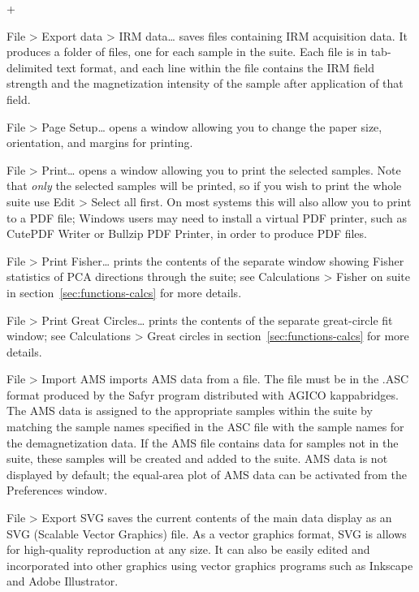\documentclass[a4paper,british]{article}
\newcommand{\menuitemlabel}[1]{%
\mbox{\textsf{#1}}\hfil}
\newenvironment{menuitemlist}%
{\begin{list}{}{%
\renewcommand{\makelabel}{\menuitemlabel}%
\setlength{\labelwidth}{35pt}%
\setlength{\leftmargin}%
             {\labelwidth+\labelsep}}}%
{\end{list}}
\newcommand{\ppcmd}[1]{\textsf{#1}} %
\newcommand{\caps}[1]{\MakeTextUppercase{#1}} %
\newcommand{\submenu}{ \textgreater{} } %
\begin{document}
\begin{menuitemlist}
\item[File\submenu Export data\submenu IRM data\ldots] saves files containing
\caps{irm} acquisition data. It produces a folder of files, one for each
sample in the suite. Each file is in tab-delimited text format, and each line
within the file contains the \caps{irm} field strength and the magnetization
intensity of the sample after application of that field.

\item[File\submenu Page Setup\ldots] opens a window allowing you
to change the paper size, orientation, and margins for printing.

\item[File\submenu Print\ldots] opens a window allowing you to print the
selected samples. Note that {\em only} the selected samples will be printed,
so if you wish to print the whole suite use \ppcmd{Edit\submenu Select all} first.
On most systems this will also allow you to print to a \caps{pdf} file;
Windows users may need to install a virtual \caps{pdf} printer, such as
Cute\caps{pdf} Writer or Bullzip \caps{pdf} Printer, in order to produce
\caps{pdf} files.

\item[File\submenu Print Fisher\ldots] prints the contents of the separate
window showing Fisher statistics of \caps{pca} directions through the suite;
see \ppcmd{Calculations\submenu Fisher on suite} in
section~\ref{sec:functions-calcs} for more details.

\item[File\submenu Print Great Circles\ldots] prints the contents of the
  separate great-circle fit window; see \ppcmd{Calculations\submenu Great
    circles} in section~\ref{sec:functions-calcs} for more details.

\item[File\submenu Import AMS] imports \caps{ams} data from a file. The
file must be in the \caps{.asc} format produced by the \ppcmd{Safyr} program
distributed with \caps{Agico} kappabridges. The \caps{ams} data is assigned
to the appropriate samples within the suite by matching the sample names
specified in the \caps{asc} file with the sample names for the
demagnetization data. If the \caps{ams} file contains data for samples not in
the suite, these samples will be created and added to the suite. \caps{Ams}
data is not displayed by default; the equal-area plot of \caps{ams} data can
be activated from the \ppcmd{Preferences} window.

\item[File\submenu Export SVG] saves the current contents of the main
data display as an \caps{svg} (Scalable Vector Graphics) file. As a vector
graphics format, \caps{svg} is allows for high-quality reproduction at any
size. It can also be easily edited and incorporated into other graphics using
vector graphics programs such as Inkscape and Adobe Illustrator.


\end{menuitemlist}
\end{document}
